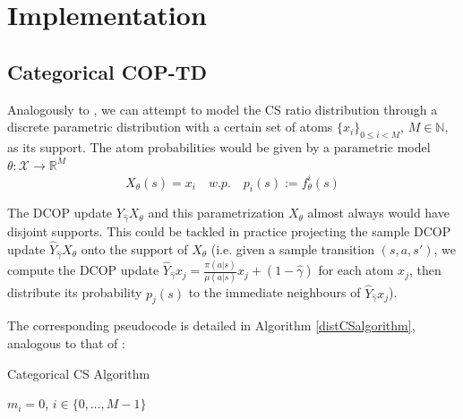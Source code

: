 \documentclass[12pt,a4paper,openright,twoside]{article}
\numberwithin{equation}{section}
\theoremstyle{definition}
\theoremstyle{remark}
\theoremstyle{plain}
\begin{document}
\newpage

\thispagestyle{plain}
\section{Implementation}

\subsection{Categorical COP-TD}

Analogously to \cite{DRL}, we can attempt to model the CS ratio distribution through a discrete parametric distribution with a certain set of atoms $\{x_i\}_{0 \leq i<M}$, $M \in \mathbb{N}$, as its support. The atom probabilities would be given by a parametric model $\theta : \mathcal{X} \rightarrow \mathbb{R}^M$
\begin{equation}
    X_{\theta} (s) = x_i \quad w.p. \quad p_i(s) := f_{\theta}^i(s)
\end{equation}

The DCOP update $Y_{\hat{\gamma}}X_\theta$ and this parametrization $X_\theta$ almost always would have disjoint supports. This could be tackled in practice projecting the sample DCOP update $\hat{Y}_{\hat{\gamma}}X_\theta$ onto the support of $X_\theta$ (i.e. given a sample transition $(s,a,s')$, we compute the DCOP update $\hat{Y}_{\hat{\gamma}}x_j =  \frac{\pi(a|s)}{\mu(a|s)}x_j + (1-\hat{\gamma})$ for each atom $x_j$, then distribute its probability $p_j(s)$ to the immediate neighbours of $\hat{Y}_{\hat{\gamma}}x_j$).

The corresponding pseudocode is detailed in Algorithm \ref{distCSalgorithm}, analogous to that of \cite{DRL}:

\setlength{\algomargin}{1.5em}
\SetAlCapHSkip{0em}
\begin{algorithm}[H]
\caption{Categorical CS Algorithm} \label{distCSalgorithm}
\DontPrintSemicolon
{}
    $m_i = 0$, $i\in \{0,\dots, M-1\}$\;

\end{algorithm}
\end{document}
